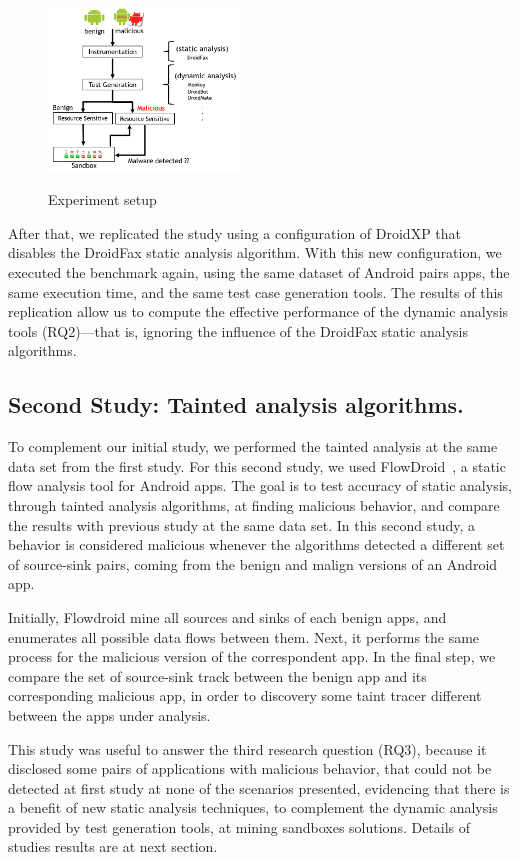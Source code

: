 \begin{figure}[ht]
   \includegraphics[width=0.45\textwidth]{images/setup2.png}
   \label{Experiment setup}
   \caption{Experiment setup}
   \label{fig:setup}
 \end{figure}

After that, we replicated the study using a configuration of DroidXP that disables the DroidFax static analysis algorithm. With this new configuration, we executed the benchmark again, using the same dataset of Android pairs apps, the same execution time, and the same test case generation tools.
The results of this replication allow us to compute the effective performance
of the dynamic analysis tools (RQ2)---that is, ignoring the influence of the
DroidFax static analysis algorithms.

\subsection{Second Study: Tainted analysis algorithms.}

To complement our initial study, we performed the tainted analysis at the same
data set from the first study. For this second study, we used
FlowDroid~\cite{10.1145/2666356.2594299}, a static flow analysis tool for Android apps.
The goal is to test accuracy of static analysis, through tainted analysis algorithms, at finding malicious behavior, and compare the results with previous study at the same data set.
In this second study, a behavior is considered malicious whenever the algorithms
detected a different set of source-sink pairs, coming from the benign and malign
versions of an Android app. 

Initially, Flowdroid mine all sources and sinks of each benign apps, and enumerates all possible data flows between them. Next, it performs the same process for the malicious version
of the correspondent app. In the final step, we compare the set of source-sink track between the benign app and its corresponding malicious app, in order to discovery some taint tracer different between the apps under analysis.

This study was useful to answer the third research question (RQ3), because it disclosed some pairs of applications with malicious behavior, that could not be detected at first study at none of the scenarios presented, evidencing that there is a benefit of new static analysis techniques, to complement the dynamic analysis provided by test generation tools, at mining sandboxes solutions. Details of studies results are at next section.





